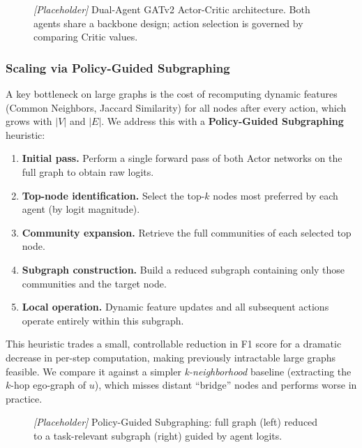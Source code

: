 \documentclass[twocolumn,a4paper]{article}
\begin{document}
\begin{figure}[h]
  \centering
  \fbox{\rule{0pt}{5cm}\rule{\linewidth}{0pt}}
  \caption{\textit{[Placeholder]} Dual-Agent GATv2 Actor-Critic architecture.
    Both agents share a backbone design; action selection is governed by
    comparing Critic values.}
  \label{fig:ac-v2}
\end{figure}

\subsubsection*{Scaling via Policy-Guided Subgraphing}

A key bottleneck on large graphs is the cost of recomputing dynamic features
(Common Neighbors, Jaccard Similarity) for all nodes after every action, which
grows with $|V|$ and $|E|$. We address this with a \textbf{Policy-Guided
Subgraphing} heuristic:

\begin{enumerate}
  \item \textbf{Initial pass.} Perform a single forward pass of both Actor
    networks on the full graph to obtain raw logits.
  \item \textbf{Top-node identification.} Select the top-$k$ nodes most
    preferred by each agent (by logit magnitude).
  \item \textbf{Community expansion.} Retrieve the full communities of each
    selected top node.
  \item \textbf{Subgraph construction.} Build a reduced subgraph containing
    only those communities and the target node.
  \item \textbf{Local operation.} Dynamic feature updates and all subsequent
    actions operate entirely within this subgraph.
\end{enumerate}

This heuristic trades a small, controllable reduction in F1 score for a
dramatic decrease in per-step computation, making previously intractable large
graphs feasible. We compare it against a simpler \textit{k-neighborhood}
baseline (extracting the $k$-hop ego-graph of $u$), which misses distant
``bridge'' nodes and performs worse in practice.

\begin{figure}[h]
  \centering
  \fbox{\rule{0pt}{3.5cm}\rule{\linewidth}{0pt}}
  \caption{\textit{[Placeholder]} Policy-Guided Subgraphing: full graph
    (left) reduced to a task-relevant subgraph (right) guided by agent logits.}
  \label{fig:subgraph}
\end{figure}
\end{document}

